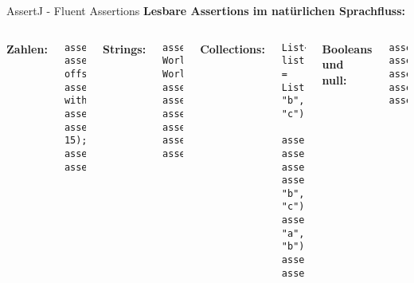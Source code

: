 \begin{frame}[fragile]{AssertJ - Fluent Assertions}
  \textbf{Lesbare Assertions im natürlichen Sprachfluss:}

  \begin{columns}[T]
    \textbf{Zahlen:}
    \begin{lstlisting}[style=java, basicstyle=\tiny\ttfamily]
assertThat(42).isEqualTo(42);
assertThat(3.14159).isCloseTo(3.14, offset(0.01));
assertThat(100.0).isCloseTo(99.0, withPercentage(2));
assertThat(5).isGreaterThan(3);
assertThat(10).isBetween(5, 15);
assertThat(-5).isNegative();
assertThat(0).isZero();
    \end{lstlisting}

    \textbf{Strings:}
    \begin{lstlisting}[style=java, basicstyle=\tiny\ttfamily]
assertThat("Hello World").isEqualTo("Hello World");
assertThat("Java").contains("av");
assertThat("").isEmpty();
assertThat("NotEmpty").isNotEmpty();
assertThat("Hello").startsWith("Hel");
assertThat("World").endsWith("rld");
assertThat("HELLO").isEqualToIgnoringCase("hello");
    \end{lstlisting}

    \textbf{Collections:}
    \begin{lstlisting}[style=java, basicstyle=\tiny\ttfamily]
List<String> list = List.of("a", "b", "c");

assertThat(list).hasSize(3);
assertThat(list).contains("b");
assertThat(list).doesNotContain("d");
assertThat(list).containsExactly("a", "b", "c");
assertThat(list).containsExactlyInAnyOrder("c", "a", "b");
assertThat(list).startsWith("a");
assertThat(list).isNotEmpty();
    \end{lstlisting}

    \textbf{Booleans und null:}
    \begin{lstlisting}[style=java, basicstyle=\tiny\ttfamily]
assertThat(true).isTrue();
assertThat(false).isFalse();
assertThat(object).isNull();
assertThat(object).isNotNull();
assertThat(object).isInstanceOf(String.class);
    \end{lstlisting}
  \end{columns}
\end{frame}


